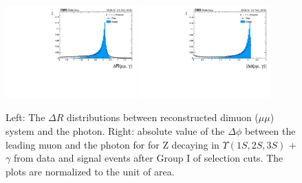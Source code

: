 \begin{figure}[!htbp]
\begin{center}
\includegraphics[width=0.45\textwidth]{figures/outputPlots/ZtoUpsilon_Cat0_ZZZZZ/au/data_x_mc/noKinCuts/h_noKin_deltaR_Upsilon_Photon}\hspace*{1.cm}
\includegraphics[width=0.45\textwidth]{figures/outputPlots/ZtoUpsilon_Cat0_ZZZZZ/au/data_x_mc/noKinCuts/h_noKin_deltaPhi_Upsilon_Photon}\end{center}\vspace*{-.5cm}
\caption{Left: The $\Delta R$ distributions between reconstructed dimuon ($\mu\mu$) system and the photon. Right: absolute value of the $\Delta \phi$ between the leading muon and the photon for for Z decaying in $\Upsilon(1S,2S,3S)$ + $\gamma$ from data and signal events after Group I of selection cuts. The plots are normalized to the unit of area.}
\label{fig:deltaRdeltaPhi_ZtoUpsilon_Cat0}
\end{figure}


